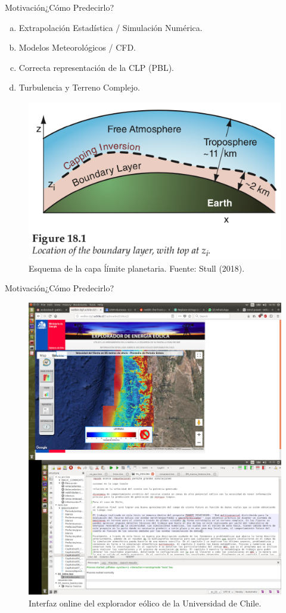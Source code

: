 \documentclass[mathserif,10pt]{beamer}
\begin{document}
\begin{frame}{Motivación}{¿Cómo Predecirlo?}
	\begin{enumerate}[a.]
		\item Extrapolación Estadística / Simulación Numérica.
		\item Modelos Meteorológicos / CFD.
		\item Correcta representación de la CLP (PBL).
		\item Turbulencia y Terreno Complejo.
	\end{enumerate}
	\begin{figure}[h]
		\centering
		\includegraphics[width=0.7\linewidth,trim={0cm 2.5cm 0cm 0cm},clip]{fig/abl-color}
		\vspace{-4mm}
		\caption{Esquema de la capa ĺímite planetaria. Fuente: Stull (2018).}
		\label{fig:01_abl}
	\end{figure}
\end{frame}

\begin{frame}{Motivación}{¿Cómo Predecirlo?}
\begin{figure}[h]
	\centering
	\includegraphics[width=0.8\linewidth,trim={1.4cm 28cm 15cm 3.4cm},clip]{fig/01/explo}
	\vspace{-4mm}
	\caption{Interfaz online del explorador eólico de la Universidad de Chile.}
	\label{fig:01_explorador}
\end{figure}
\end{frame}
\end{document}
